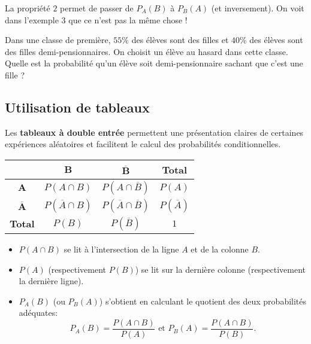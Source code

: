 \documentclass[11pt]{article}
\begin{document}
\begin{rmq}
  La propriété $2$ permet de passer de $P_A(B)$ à $P_B(A)$ (et inversement). On
  voit dans l'exemple $3$ que ce n'est pas la même chose !
\end{rmq}

\begin{app}
  Dans une classe de première, $55$\% des élèves sont des filles et $40$\% des
  élèves sont des filles demi-pensionnaires. On choisit un élève au hasard dans
  cette classe. Quelle est la probabilité qu'un élève soit demi-pensionnaire
  sachant que c'est une fille ?
\end{app}

\subsection{Utilisation de tableaux}

\begin{notation}
Les \textbf{tableaux à double entrée} permettent une présentation claires de certaines
expériences aléatoires et facilitent le calcul des probabilités conditionnelles.
\begin{center}
\renewcommand{\arraystretch}{1.5}
\begin{tabular}{cccc}
  \toprule
  & $\mathbf{B}$ & $\mathbf{\overline B}$ & \textbf{Total} \\ \midrule
  $\mathbf{A}$ & $P(A\cap B)$ & $P(A\cap\overline B)$ & $P(A)$ \\
  $\mathbf{\overline A}$ & $P(\overline A\cap B)$ & $P(\overline A\cap\overline
  B)$ & $P(\overline A)$ \\
  \textbf{Total} & $P(B)$ & $P(\overline B)$ & $1$ \\ \bottomrule
\end{tabular}
\end{center}
\begin{itemize}
  \item $P(A\cap B)$ se lit à l'intersection de la ligne $A$ et de la colonne
    $B$.
  \item $P(A)$ (respectivement $P(B)$) se lit sur la dernière colonne
    (respectivement la dernière ligne).
  \item $P_A(B)$ (ou $P_B(A)$) s'obtient en calculant le quotient des deux
    probabilités adéquates:
    \[
      P_A(B) = \frac{P(A\cap B)}{P(A)}\text{ et }P_B(A) = \frac{P(A\cap
      B)}{P(B)}.
    \]
\end{itemize}
\end{notation}
\end{document}
